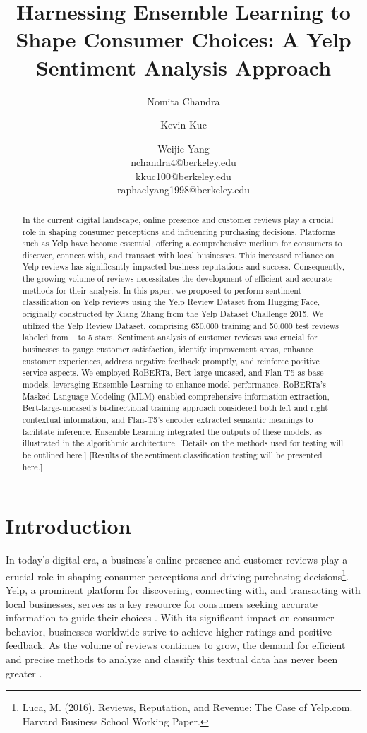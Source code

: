\documentclass[12pt]{article}
\title{Harnessing Ensemble Learning to Shape Consumer Choices: A Yelp Sentiment Analysis Approach}
\author{Nomita Chandra \and Kevin Kuc \and Weijie Yang \\
        nchandra4@berkeley.edu \\ kkuc100@berkeley.edu \\ raphaelyang1998@berkeley.edu}
\begin{document}
\maketitle
\begin{abstract}
  In the current digital landscape, online presence and customer reviews play a crucial role in shaping consumer perceptions and influencing purchasing decisions. Platforms such as Yelp have become essential, offering a comprehensive medium for consumers to discover, connect with, and transact with local businesses. This increased reliance on Yelp reviews has significantly impacted business reputations and success. Consequently, the growing volume of reviews necessitates the development of efficient and accurate methods for their analysis. In this paper, we proposed to perform sentiment classification on Yelp reviews using the \href{https://huggingface.co/datasets/Yelp/yelp_review_full}{Yelp Review Dataset} from Hugging Face, originally constructed by Xiang Zhang from the Yelp Dataset Challenge 2015. We utilized the Yelp Review Dataset, comprising 650,000 training and 50,000 test reviews labeled from 1 to 5 stars. Sentiment analysis of customer reviews was crucial for businesses to gauge customer satisfaction, identify improvement areas, enhance customer experiences, address negative feedback promptly, and reinforce positive service aspects. We employed RoBERTa, Bert-large-uncased, and Flan-T5 as base models, leveraging Ensemble Learning to enhance model performance. RoBERTa’s Masked Language Modeling (MLM) enabled comprehensive information extraction, Bert-large-uncased’s bi-directional training approach considered both left and right contextual information, and Flan-T5’s encoder extracted semantic meanings to facilitate inference. Ensemble Learning integrated the outputs of these models, as illustrated in the algorithmic architecture. [Details on the methods used for testing will be outlined here.] [Results of the sentiment classification testing will be presented here.]
\end{abstract}


\section{Introduction}
In today’s digital era, a business's online presence and customer reviews play a crucial role in shaping consumer perceptions and driving purchasing decisions\footnote{Luca, M. (2016). Reviews, Reputation, and Revenue: The Case of Yelp.com. Harvard Business School Working Paper.}. Yelp, a prominent platform for discovering, connecting with, and transacting with local businesses, serves as a key resource for consumers seeking accurate information to guide their choices \citep{lee2014impact}. With its significant impact on consumer behavior, businesses worldwide strive to achieve higher ratings and positive feedback. As the volume of reviews continues to grow, the demand for efficient and precise methods to analyze and classify this textual data has never been greater \citep{pang2008sentiment}.
\end{document}
